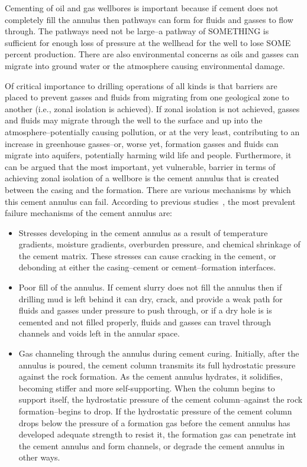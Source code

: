 \documentclass[pdftex,ms]{pittetd}
\begin{document}

Cementing of oil and gas wellbores is important because if cement does not completely fill the annulus then pathways can form for fluids and gasses to flow through.
The pathways need not be large--a pathway of SOMETHING is sufficient for enough loss of pressure at the wellhead for the well to lose SOME percent production.
There are also environmental concerns as oils and gasses can migrate into ground water or the atmosphere causing environmental damage.

Of critical importance to drilling operations of all kinds is that barriers are placed to prevent gasses and fluids from migrating from one geological zone to another (i.e., zonal isolation is achieved).
If zonal isolation is not achieved, gasses and fluids may migrate through the well to the surface and up into the atmosphere--potentially causing pollution, or at the very least, contributing to an increase in greenhouse gasses--or, worse yet, formation gasses and fluids can migrate into aquifers, potentially harming wild life and people.
Furthermore, it can be argued that the most important, yet vulnerable, barrier in terms of achieving zonal isolation of a wellbore is the cement annulus that is created between the casing and the formation.
There are various mechanisms by which this cement annulus can fail.
According to previous studies~\cite{Bit02,Che85,Lev79,Ste88,Tal93,Zul12}, the most prevalent failure mechanisms of the cement annulus are:
\begin{itemize}
\item Stresses developing in the cement annulus as a result of temperature gradients, moisture gradients, overburden pressure, and chemical shrinkage of the cement matrix.
These stresses can cause cracking in the cement, or debonding at either the casing--cement or cement--formation interfaces.
\item Poor fill of the annulus. If cement slurry does not fill the annulus then if drilling mud is left behind it can dry, crack, and provide a weak path for fluids and gasses under pressure to push through, or if a dry hole is is cemented and not filled properly, fluids and gasses can travel through channels and voids left in the annular space.
\item Gas channeling through the annulus during cement curing.
Initially, after the annulus is poured, the cement column transmits its full hydrostatic pressure against the rock formation.
As the cement annulus hydrates, it solidifies, becoming stiffer and more self-supporting.
When the column begins to support itself, the hydrostatic pressure of the cement column--against the rock formation--begins to drop.
If the hydrostatic pressure of the cement column drops below the pressure of a formation gas before the cement annulus has developed adequate strength to resist it, the formation gas can penetrate int the cement annulus and form channels, or degrade the cement annulus in other ways.
\end{itemize}
\end{document}
